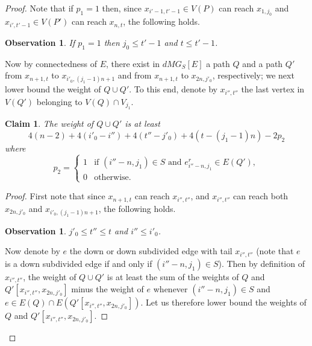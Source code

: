 \documentclass[a4paper,11pt]{article}
\theoremstyle{plain}
\newtheorem{observation}[theorem]{Observation}
\newtheorem{claim}[theorem]{Claim}
\newtheorem{identification rule}{Identification Rule}
\theoremstyle{definition}
\theoremstyle{remark}
\newenvironment{claimproof}{\begin{proof}\renewcommand{\qedsymbol}{\claimqed}}{\end{proof}\renewcommand{\qedsymbol}{\plainqed}}
\let\plainqed\qedsymbol
\newcommand{\claimqed}{$\lrcorner$}
\begin{document}
\begin{proof}
Note that if $p_1 = 1$ then, since $x_{i'-1,t'-1} \in V(P)$ can reach $x_{1,j_0}$ and $x_{i',t'-1} \in V(P')$ can reach $x_{n,t}$, the following holds.

\begin{observation}
\label{obs:p1}
If $p_1 = 1$ then $j_0 \leq t'-1$ and $t \leq t'-1$.
\end{observation} 

Now by connectedness of $E$, there exist in $dMG_S[E]$ a path $Q$ and a path $Q'$ from $x_{n+1,t}$ to $x_{i'_0,(j_1-1)n+1}$ and from $x_{n+1,t}$ to $x_{2n,j'_0}$, respectively; we next lower bound the weight of $Q \cup Q'$. To this end, denote by $x_{i'',t''}$ the last vertex in $V(Q')$ belonging to $V(Q) \cap V_{j_1}$. 

\begin{claim}
\label{clm:weightQQ'}
The weight of $Q \cup Q'$ is at least 
\[
4(n-2) + 4(i'_0-i'') + 4(t''-j'_0) + 4(t-(j_1-1)n) - 2p_2
\]
where 
$$
p_2 = \left\{
    \begin{array}{ll}
        1 & \mbox{if } (i''-n,j_1) \in S \mbox{ and } e^r_{i''-n,j_1} \in E(Q'),\\
        0 & \mbox{otherwise.}
    \end{array}
\right.
$$
\end{claim}

\begin{claimproof}
First note that since $x_{n+1,t}$ can reach $x_{i'',t''}$, and $x_{i'',t''}$ can reach both $x_{2n,j'_0}$ and $x_{i'_0,(j_1-1)n+1}$, the following holds.

\begin{observation}
\label{obs:t''}
$j'_0 \leq t'' \leq t$ and $i'' \leq i'_0$. 
\end{observation}

Now denote by $e$ the down or down subdivided edge with tail $x_{i'',t''}$ (note that $e$ is a down subdivided edge if and only if $(i''-n,j_1) \in S$). Then by definition of $x_{i'',t''}$, the weight of $Q \cup Q'$ is at least the sum of the weights of $Q$ and $Q'[x_{i'',t''},x_{2n,j'_0}]$ minus the weight of $e$ whenever $(i''-n,j_1) \in S$ and $e \in E(Q) \cap E(Q'[x_{i'',t''},x_{2n,j'_0}])$. Let us therefore lower bound the weights of $Q$ and $Q'[x_{i'',t''},x_{2n,j'_0}]$. 


\end{claimproof}
\end{proof}
\end{document}
